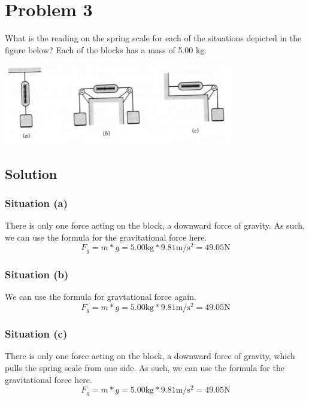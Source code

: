\documentclass[12pt]{article}
\begin{document}
\section*{Problem 3}
What is the reading on the spring scale for each of the situations depicted in the figure below? Each of the blocks has a mass of 5.00 kg.

\begin{center}
    \includegraphics*[width=10cm]{graph_3.png}
\end{center}

\subsection*{Solution}
\subsubsection*{Situation (a)}
There is only one force acting on the block, a downward force of gravity. As such, we can use the formula for the gravitational force here.
\[ 
    F_g = m*g 
        = 5.00 \unit{\kilo\gram} * 9.81\unit{\meter/\second^2}
        = \boxed{ 49.05 \unit{\newton} }
\]

\subsubsection*{Situation (b)}
We can use the formula for gravtational force again.
\[ 
    F_g = m*g
        = 5.00 \unit{\kilo\gram} * 9.81\unit{\meter/\second^2}
        = \boxed{ 49.05 \unit{\newton} }
\]

\subsubsection*{Situation (c)}
There is only one force acting on the block, a downward force of gravity, which pulls the spring scale from one side. As such, we can use the formula for the gravitational force here.
\[ 
    F_g = m*g 
        = 5.00 \unit{\kilo\gram} * 9.81\unit{\meter/\second^2}
        = \boxed{ 49.05 \unit{\newton} }
\]

\pagebreak
\end{document}
